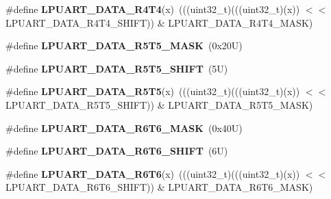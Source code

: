 \begin{DoxyCompactItemize}
\item 
\mbox{\label{group___l_p_u_a_r_t___register___masks_gadeaa404162ba0736b41e864b9ef1f422}} 
\#define {\bfseries L\+P\+U\+A\+R\+T\+\_\+\+D\+A\+T\+A\+\_\+\+R4\+T4}(x)~(((uint32\+\_\+t)(((uint32\+\_\+t)(x)) $<$$<$ L\+P\+U\+A\+R\+T\+\_\+\+D\+A\+T\+A\+\_\+\+R4\+T4\+\_\+\+S\+H\+I\+FT)) \& L\+P\+U\+A\+R\+T\+\_\+\+D\+A\+T\+A\+\_\+\+R4\+T4\+\_\+\+M\+A\+SK)
\item 
\mbox{\label{group___l_p_u_a_r_t___register___masks_gacd1b7750820c72e4f4091ac62c56855d}} 
\#define {\bfseries L\+P\+U\+A\+R\+T\+\_\+\+D\+A\+T\+A\+\_\+\+R5\+T5\+\_\+\+M\+A\+SK}~(0x20\+U)
\item 
\mbox{\label{group___l_p_u_a_r_t___register___masks_ga495c0a26e8bf85ba8a47d2088d58008c}} 
\#define {\bfseries L\+P\+U\+A\+R\+T\+\_\+\+D\+A\+T\+A\+\_\+\+R5\+T5\+\_\+\+S\+H\+I\+FT}~(5\+U)
\item 
\mbox{\label{group___l_p_u_a_r_t___register___masks_ga378513ba6b28569e391405f65c9f949a}} 
\#define {\bfseries L\+P\+U\+A\+R\+T\+\_\+\+D\+A\+T\+A\+\_\+\+R5\+T5}(x)~(((uint32\+\_\+t)(((uint32\+\_\+t)(x)) $<$$<$ L\+P\+U\+A\+R\+T\+\_\+\+D\+A\+T\+A\+\_\+\+R5\+T5\+\_\+\+S\+H\+I\+FT)) \& L\+P\+U\+A\+R\+T\+\_\+\+D\+A\+T\+A\+\_\+\+R5\+T5\+\_\+\+M\+A\+SK)
\item 
\mbox{\label{group___l_p_u_a_r_t___register___masks_ga4fff31ab2e0b73feb275a1deb08ec8d1}} 
\#define {\bfseries L\+P\+U\+A\+R\+T\+\_\+\+D\+A\+T\+A\+\_\+\+R6\+T6\+\_\+\+M\+A\+SK}~(0x40\+U)
\item 
\mbox{\label{group___l_p_u_a_r_t___register___masks_gaad0d89ef64632ae3d0aeb989a8097d64}} 
\#define {\bfseries L\+P\+U\+A\+R\+T\+\_\+\+D\+A\+T\+A\+\_\+\+R6\+T6\+\_\+\+S\+H\+I\+FT}~(6\+U)
\item 
\mbox{\label{group___l_p_u_a_r_t___register___masks_gac53f01a82a369fdf4003bfa70f48fd36}} 
\#define {\bfseries L\+P\+U\+A\+R\+T\+\_\+\+D\+A\+T\+A\+\_\+\+R6\+T6}(x)~(((uint32\+\_\+t)(((uint32\+\_\+t)(x)) $<$$<$ L\+P\+U\+A\+R\+T\+\_\+\+D\+A\+T\+A\+\_\+\+R6\+T6\+\_\+\+S\+H\+I\+FT)) \& L\+P\+U\+A\+R\+T\+\_\+\+D\+A\+T\+A\+\_\+\+R6\+T6\+\_\+\+M\+A\+SK)
$$
\end{DoxyCompactItemize}
